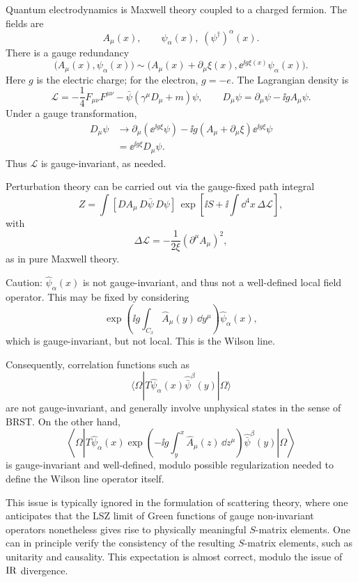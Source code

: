 Quantum electrodynamics is Maxwell theory coupled to a charged fermion.  The
fields are
\[
  A_\mu(x),
  \qquad
  \psi_\alpha(x),\;(\psi^\dagger)^\alpha(x).
\]
There is a gauge redundancy
\[
  \bigl(A_\mu(x),\psi_\alpha(x)\bigr)
  \sim
  \bigl(A_\mu(x)+\partial_\mu\xi(x),
  \ee^{\ii g\xi(x)}\psi_\alpha(x)\bigr).
\]
Here \(g\) is the electric charge; for the electron, \(g=-e\).  The
Lagrangian density is
\[
  \mathcal L
  =
  -\frac14F_{\mu\nu}F^{\mu\nu}
  -\bar\psi(\gamma^\mu D_\mu+m)\psi,
  \qquad
  D_\mu\psi=\partial_\mu\psi-\ii g A_\mu\psi.
\]
Under a gauge transformation,
\[
\begin{aligned}
  D_\mu\psi
  &\to
  \partial_\mu(\ee^{\ii g\xi}\psi)
  -\ii g(A_\mu+\partial_\mu\xi)\ee^{\ii g\xi}\psi
\\
  &=\ee^{\ii g\xi}D_\mu\psi .
\end{aligned}
\]
Thus \(\mathcal L\) is gauge-invariant, as needed.

Perturbation theory can be carried out via the gauge-fixed path integral
\[
  Z
  =
  \int[DA_\mu\,D\bar\psi\,D\psi]\,
  \exp\left[
    \ii S+\ii\int\dd^4x\,\Delta\mathcal L
  \right],
\]
with
\[
  \Delta\mathcal L
  =
  -\frac{1}{2\xi}(\partial^\mu A_\mu)^2,
\]
as in pure Maxwell theory.

Caution: \(\widehat\psi_\alpha(x)\) is not gauge-invariant, and thus not a
well-defined local field operator.  This may be fixed by considering
\[
  \exp\left(
    \ii g\int_{C_x}\widehat A_\mu(y)\,\dd y^\mu
  \right)
  \widehat\psi_\alpha(x),
\]
which is gauge-invariant, but not local.  This is the Wilson line.

Consequently, correlation functions such as
\[
  \langle\Omega|
  T\widehat\psi_\alpha(x)\widehat{\bar\psi}^{\beta}(y)
  |\Omega\rangle
\]
are not gauge-invariant, and generally involve unphysical states in the
sense of BRST.  On the other hand,
\[
  \left\langle\Omega\left|
  T\widehat\psi_\alpha(x)
  \exp\left(
    -\ii g\int_y^x\widehat A_\mu(z)\,\dd z^\mu
  \right)
  \widehat{\bar\psi}^{\beta}(y)
  \right|\Omega\right\rangle
\]
is gauge-invariant and well-defined, modulo possible regularization needed
to define the Wilson line operator itself.

This issue is typically ignored in the formulation of scattering theory,
where one anticipates that the LSZ limit of Green functions of gauge
non-invariant operators nonetheless gives rise to physically meaningful
\(S\)-matrix elements.  One can in principle verify the consistency of the
resulting \(S\)-matrix elements, such as unitarity and causality.  This
expectation is almost correct, modulo the issue of \(\mathrm{IR}\) divergence.

